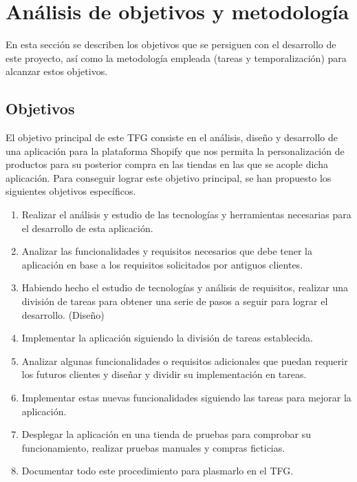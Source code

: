 \documentclass[12pt]{article}
\begin{document}
\section{Análisis de objetivos y metodología}
En esta sección se describen los objetivos que se persiguen con el desarrollo de este proyecto, así como la metodología empleada (tareas y temporalización) para alcanzar estos objetivos.

\subsection{Objetivos}

El objetivo principal de este TFG consiste en el análisis, diseño y desarrollo de una aplicación para la plataforma Shopify que nos permita
la personalización de productos para su posterior compra en las tiendas en las que se acople dicha aplicación. Para conseguir lograr este objetivo 
principal, se han propuesto los siguientes objetivos específicos.

\begin{enumerate}
    \item Realizar el análisis y estudio de las tecnologías y herramientas necesarias para el desarrollo de esta aplicación. \label{item:objetivo1}
    \item Analizar las funcionalidades y requisitos necesarios que debe tener la aplicación en base a los requisitos solicitados por antiguos clientes. \label{item:objetivo2}
    \item Habiendo hecho el estudio de tecnologías y análisis de requisitos, realizar una división de tareas para obtener una serie de pasos a seguir para lograr el desarrollo. (Diseño) \label{item:objetivo3}
    \item Implementar la aplicación siguiendo la división de tareas establecida. \label{item:objetivo4}
    \item Analizar algunas funcionalidades o requisitos adicionales que puedan requerir los futuros clientes y diseñar y dividir su implementación en tareas. \label{item:objetivo5}
    \item Implementar estas nuevas funcionalidades siguiendo las tareas para mejorar la aplicación. \label{item:objetivo6}
    \item Desplegar la aplicación en una tienda de pruebas para comprobar su funcionamiento, realizar pruebas manuales y compras ficticias. \label{item:objetivo7}
    \item Documentar todo este procedimiento para plasmarlo en el TFG. \label{item:objetivo8}
\end{enumerate}
\end{document}

